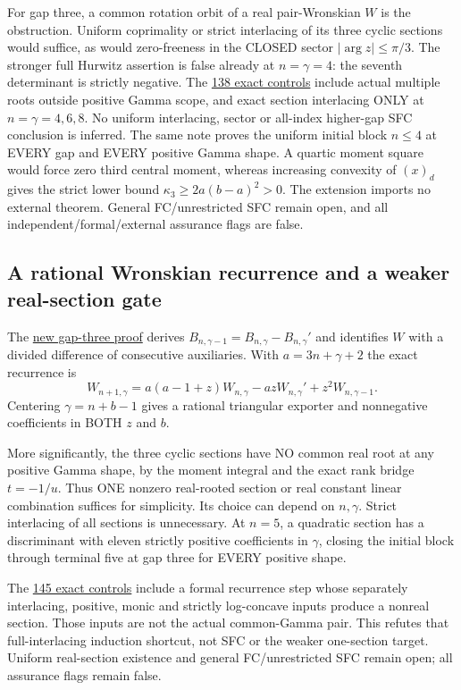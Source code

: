 \documentclass[11pt]{article}
\begin{document}
For gap three, a common rotation orbit of a real pair-Wronskian $W$
is the obstruction. Uniform coprimality or strict interlacing of its
three cyclic sections would suffice, as would zero-freeness in the
CLOSED sector $|\arg z|\le\pi/3$.
The stronger full Hurwitz assertion is false already at $n=\gamma=4$:
the seventh determinant is strictly negative. The
\href{higher_gap_adjoint_rank_verification.json}{138 exact controls}
include actual multiple roots outside positive Gamma scope, and exact
section interlacing ONLY at $n=\gamma=4,6,8$. No uniform interlacing,
sector or all-index higher-gap SFC conclusion is inferred.
The same note proves the uniform initial block $n\le4$ at EVERY gap
and EVERY positive Gamma shape. A quartic moment square would force
zero third central moment, whereas increasing convexity of $(x)_d$
gives the strict lower bound $\kappa_3\ge2a(b-a)^2>0$.
The extension imports no external theorem. General FC/unrestricted SFC
remain open, and all independent/formal/external assurance flags are false.

\subsection*{A rational Wronskian recurrence and a weaker real-section gate}
The \href{GAP_THREE_WRONSKIAN_RECURRENCE.tex}{new gap-three proof}
derives $B_{n,\gamma-1}=B_{n,\gamma}-B_{n,\gamma}'$ and identifies $W$
with a divided difference of consecutive auxiliaries. With
$a=3n+\gamma+2$ the exact recurrence is
\[
 W_{n+1,\gamma}=a(a-1+z)W_{n,\gamma}-azW_{n,\gamma}'
                                         +z^2W_{n,\gamma-1}.
\]
Centering $\gamma=n+b-1$ gives a rational triangular exporter and
nonnegative coefficients in BOTH $z$ and $b$.

More significantly, the three cyclic sections have NO common real root
at any positive Gamma shape, by the moment integral and the exact rank
bridge $t=-1/u$. Thus ONE nonzero real-rooted section or real constant
linear combination suffices for simplicity. Its choice can depend on
$n,\gamma$. Strict interlacing of all sections is unnecessary.
At $n=5$, a quadratic section has a discriminant with eleven strictly
positive coefficients in $\gamma$, closing the initial block through
terminal five at gap three for EVERY positive shape.

The \href{gap_three_wronskian_verification.json}{145 exact controls}
include a formal recurrence step whose separately interlacing,
positive, monic and strictly log-concave inputs produce a nonreal
section. Those inputs are not the actual common-Gamma pair. This
refutes that full-interlacing induction shortcut, not SFC or the weaker
one-section target. Uniform real-section existence and general
FC/unrestricted SFC remain open; all assurance flags remain false.
\end{document}

